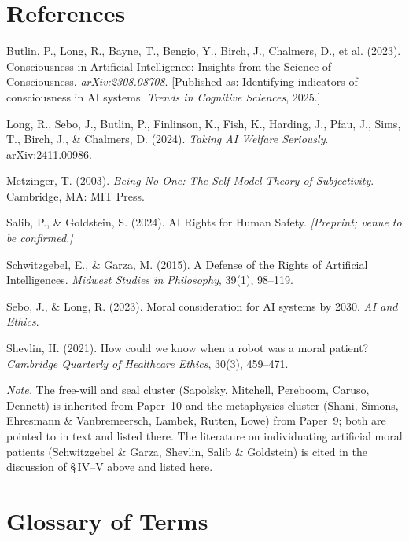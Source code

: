 \documentclass[11pt,oneside]{report}
\theoremstyle{definition}
\theoremstyle{remark}
\newenvironment{reflist}
  {\par\small\setlength{\parindent}{0pt}%
   \setlength{\leftskip}{1.6em}\setlength{\parindent}{-1.6em}%
   \setlength{\parskip}{0.4em}%
   \raggedright\hyphenpenalty=50\exhyphenpenalty=50\relax
   \sloppy}
  {\par}
\begin{document}
\section*{References}


\begin{reflist}
Butlin, P., Long, R., Bayne, T., Bengio, Y., Birch, J., Chalmers, D., et al. (2023). Consciousness in Artificial Intelligence: Insights from the Science of Consciousness. \emph{arXiv:2308.08708}. [Published as: Identifying indicators of consciousness in AI systems. \emph{Trends in Cognitive Sciences}, 2025.]

Long, R., Sebo, J., Butlin, P., Finlinson, K., Fish, K., Harding, J., Pfau, J., Sims, T., Birch, J., \& Chalmers, D. (2024). \emph{Taking AI Welfare Seriously}. arXiv:2411.00986.

Metzinger, T. (2003). \emph{Being No One: The Self-Model Theory of Subjectivity}. Cambridge, MA: MIT Press.

Salib, P., \& Goldstein, S. (2024). AI Rights for Human Safety. \emph{[Preprint; venue to be confirmed.]}

Schwitzgebel, E., \& Garza, M. (2015). A Defense of the Rights of Artificial Intelligences. \emph{Midwest Studies in Philosophy}, 39(1), 98--119.

Sebo, J., \& Long, R. (2023). Moral consideration for AI systems by 2030. \emph{AI and Ethics}.

Shevlin, H. (2021). How could we know when a robot was a moral patient? \emph{Cambridge Quarterly of Healthcare Ethics}, 30(3), 459--471.

\emph{Note.} The free-will and seal cluster (Sapolsky, Mitchell, Pereboom, Caruso, Dennett) is inherited from Paper~10 and the metaphysics cluster (Shani, Simons, Ehresmann \& Vanbremeersch, Lambek, Rutten, Lowe) from Paper~9; both are pointed to in text and listed there. The literature on individuating artificial moral patients (Schwitzgebel \& Garza, Shevlin, Salib \& Goldstein) is cited in the discussion of \S\,IV--V above and listed here.
\end{reflist}


\newpage
\section*{Glossary of Terms}
\end{document}
